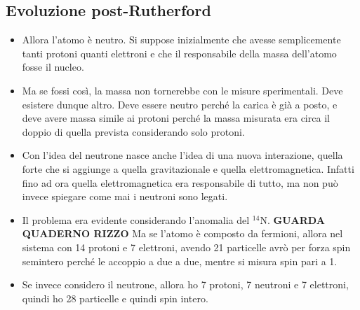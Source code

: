 \subsection{Evoluzione post-Rutherford}
\begin{itemize}
    \item Allora l'atomo è neutro. Si suppose inizialmente che avesse semplicemente tanti protoni quanti elettroni e che il responsabile della massa dell'atomo fosse il nucleo.
    \item Ma se fossi così, la massa non tornerebbe con le misure sperimentali. Deve esistere dunque altro. Deve essere neutro perché la carica è già a posto, e deve avere massa simile ai protoni perché la massa misurata era circa il doppio di quella prevista considerando solo protoni.
    \item Con l'idea del neutrone nasce anche l'idea di una nuova interazione, quella forte che si aggiunge a quella gravitazionale e quella elettromagnetica. Infatti fino ad ora quella elettromagnetica era responsabile di tutto, ma non può invece spiegare come mai i neutroni sono legati.
    \item Il problema era evidente considerando l'anomalia del $^{14}$N. \textbf{GUARDA QUADERNO RIZZO} Ma se l'atomo è composto da fermioni, allora nel sistema con 14 protoni e 7 elettroni, avendo 21 particelle avrò per forza spin semintero perché le accoppio a due a due, mentre si misura spin pari a 1. 
    \item Se invece considero il neutrone, allora ho 7 protoni, 7 neutroni e 7 elettroni, quindi ho 28 particelle e quindi spin intero.
\end{itemize}
